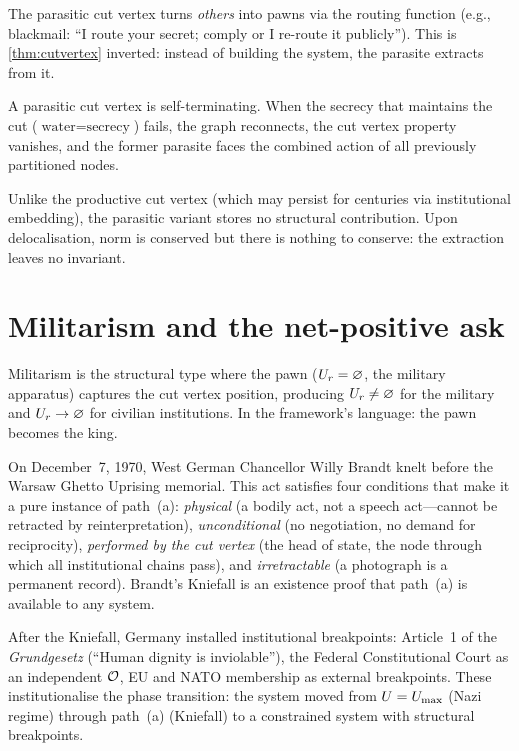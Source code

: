 The parasitic cut vertex turns \emph{others} into pawns via the
routing function (e.g., blackmail: ``I route your secret; comply or I
re-route it publicly''). This is \cref{thm:cutvertex} inverted:
instead of building the system, the parasite extracts from it.

\begin{proposition}\label{prop:parasite}
A parasitic cut vertex is self-terminating. When the secrecy that
maintains the cut ($\text{water} = \text{secrecy}$) fails, the graph
reconnects, the cut vertex property vanishes, and the former parasite
faces the combined action of all previously partitioned nodes.
\end{proposition}

Unlike the productive cut vertex (which may persist for centuries via
institutional embedding), the parasitic variant stores no structural
contribution. Upon delocalisation, norm is conserved but there is
nothing to conserve: the extraction leaves no invariant.

\section{Militarism and the net-positive ask}\label{sec:militarism}

Militarism is the structural type where the pawn ($U_r = \varnothing$,
the military apparatus) captures the cut vertex position, producing
$U_r \neq \varnothing$ for the military and $U_r \to \varnothing$ for
civilian institutions. In the framework's language: the pawn becomes the king.

\begin{example}\label{ex:kniefall}
On December~7, 1970, West German Chancellor Willy Brandt knelt before
the Warsaw Ghetto Uprising memorial. This act satisfies four conditions
that make it a pure instance of path~(a):
\emph{physical} (a bodily act, not a speech act---cannot be retracted
by reinterpretation),
\emph{unconditional} (no negotiation, no demand for reciprocity),
\emph{performed by the cut vertex} (the head of state, the node
through which all institutional chains pass), and
\emph{irretractable} (a photograph is a permanent record).
Brandt's Kniefall is an existence proof that path~(a) is available to
any system.
\end{example}

After the Kniefall, Germany installed institutional breakpoints:
Article~1 of the \emph{Grundgesetz} (``Human dignity is inviolable''),
the Federal Constitutional Court as an independent $\mathcal{O}$, EU and NATO
membership as external breakpoints. These institutionalise the phase
transition: the system moved from $U = U_{\max}$ (Nazi regime) through
path~(a) (Kniefall) to a constrained system with structural breakpoints.

